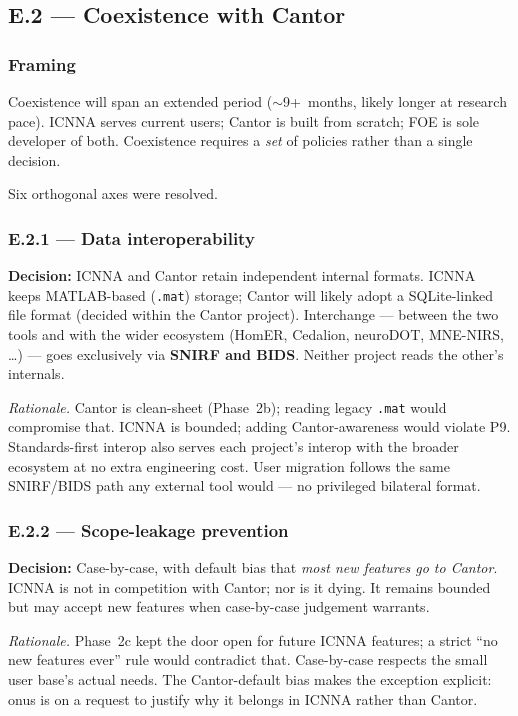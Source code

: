 \documentclass[11pt,a4paper]{article}
\begin{document}
\subsection{E.2 --- Coexistence with Cantor}

\subsubsection{Framing}

Coexistence will span an extended period ($\sim$9+~months, likely longer at research pace). ICNNA serves current users; Cantor is built from scratch; FOE is sole developer of both. Coexistence requires a \emph{set} of policies rather than a single decision.

Six orthogonal axes were resolved.

\subsubsection{E.2.1 --- Data interoperability}

\textbf{Decision:} ICNNA and Cantor retain independent internal formats. ICNNA keeps MATLAB-based (\texttt{.mat}) storage; Cantor will likely adopt a SQLite-linked file format (decided within the Cantor project). Interchange --- between the two tools and with the wider ecosystem (HomER, Cedalion, neuroDOT, MNE-NIRS, \ldots) --- goes exclusively via \textbf{SNIRF and BIDS}. Neither project reads the other's internals.

\textit{Rationale.} Cantor is clean-sheet (Phase~2b); reading legacy \texttt{.mat} would compromise that. ICNNA is bounded; adding Cantor-awareness would violate P9. Standards-first interop also serves each project's interop with the broader ecosystem at no extra engineering cost. User migration follows the same SNIRF/BIDS path any external tool would --- no privileged bilateral format.

\subsubsection{E.2.2 --- Scope-leakage prevention}

\textbf{Decision:} Case-by-case, with default bias that \emph{most new features go to Cantor}. ICNNA is not in competition with Cantor; nor is it dying. It remains bounded but may accept new features when case-by-case judgement warrants.

\textit{Rationale.} Phase~2c kept the door open for future ICNNA features; a strict ``no new features ever'' rule would contradict that. Case-by-case respects the small user base's actual needs. The Cantor-default bias makes the exception explicit: onus is on a request to justify why it belongs in ICNNA rather than Cantor.
\end{document}
